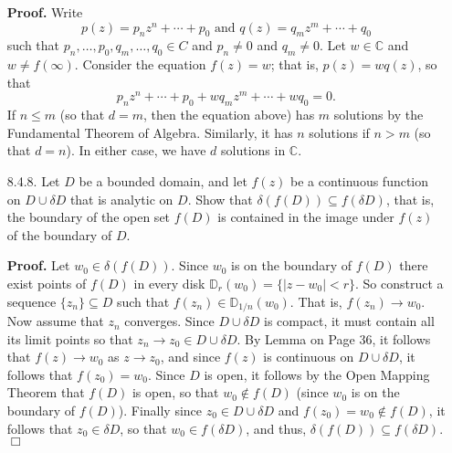 \documentclass[9pt]{article}
\newcommand{\qed}{\hfill \ensuremath{\Box}}
\newcommand{\C}{\mathbb{C}}
\begin{document}
\begin{enumerate}
   \textbf{Proof.} Write
   $$p(z) = p_nz^n + \cdots + p_0 \text{ and }q(z) = q_mz^m + \cdots + q_0$$
   such that $p_n, \ldots, p_0, q_m, \ldots, q_0 \in C$ and $p_n \neq 0$ and
   $q_m \neq 0$. Let $w \in \C$ and $w \neq f(\infty)$. Consider the equation
   $f(z) = w$; that is, $p(z) = wq(z)$, so that
   $$p_nz^n + \cdots + p_0 + wq_mz^m + \cdots + wq_0 = 0.$$
   If $n \le m$ (so that $d = m$, then the equation above) has $m$ solutions by
   the Fundamental Theorem of Algebra. Similarly, it has $n$ solutions if
   $n > m$ (so that $d = n$). In either case, we have $d$ solutions in $\C$.
             
   \item[8.4.8.]  Let $D$ be a bounded domain, and let $f(z)$ be a continuous
                  function on $D \cup \delta D$ that is analytic on $D$. Show
                  that $\delta(f(D)) \subseteq f(\delta D)$, that is, the 
                  boundary of the open set $f(D)$ is contained in the image
                  under $f(z)$ of the boundary of $D$.

      \textbf{Proof.} Let $w_0 \in \delta(f(D))$. Since $w_0$ is on the boundary
      of $f(D)$ there exist points of $f(D)$ in every disk
      $\mathbb{D}_r(w_0) = \{|z - w_0| < r\}$. So construct a sequence
      $\{z_n\} \subseteq D$ such that $f(z_n) \in \mathbb{D}_{1/n}(w_0)$. That
      is, $f(z_n) \rightarrow w_0$. Now assume that $z_n$ converges. Since
      $D \cup \delta D$ is compact, it must contain all its limit points so that
      $z_n \rightarrow z_0 \in D \cup \delta D$. By Lemma on Page 36, it follows
      that $f(z) \rightarrow w_0$ as $z \rightarrow z_0$, and since $f(z)$ is
      continuous on $D \cup \delta D$, it follows that $f(z_0) = w_0$. Since $D$
      is open, it follows by the Open Mapping Theorem that $f(D)$ is open, so
      that $w_0 \notin f(D)$ (since $w_0$ is on the boundary of $f(D)$). Finally
      since $z_0 \in D \cup \delta D$ and $f(z_0) = w_0 \notin f(D)$, it follows
      that $z_0 \in \delta D$, so that $w_0 \in f(\delta D)$, and thus,
      $\delta(f(D)) \subseteq f(\delta D)$. \qed
\end{enumerate}
\end{document}
